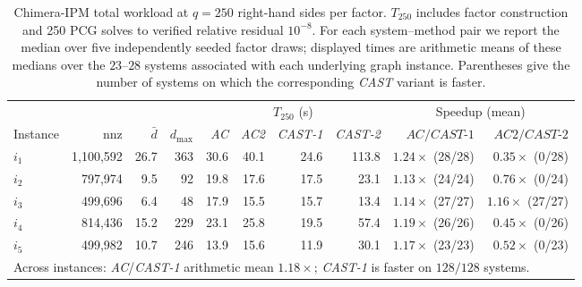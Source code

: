 \documentclass{article}
\newcommand{\CAST}{\textit{CAST}\xspace}
\newcommand{\CASTone}{\textit{CAST-1}\xspace}
\newcommand{\CASTtwo}{\textit{CAST-2}\xspace}
\newcommand{\AC}{\textit{AC}\xspace}
\newcommand{\ACtwo}{\textit{AC2}\xspace}
\newcommand{\1}{\mathbbm{1}}
\theoremstyle{plain}
\begin{document}
\begin{table}[t]
\centering
\caption{Chimera-IPM total workload at $q=250$ right-hand sides per factor.
$T_{250}$ includes factor construction and 250 PCG solves to verified
relative residual $10^{-8}$. For each system--method pair we report
the median over five independently seeded factor draws; displayed
times are arithmetic means of these medians over the $23$--$28$
systems associated with each underlying graph instance. Parentheses give the number
of systems on which the corresponding \CAST{} variant is faster. } 
\label{tab:chimera250}
\small
\begin{tabular}{l r r r rrrr rr}
\toprule
& & & & \multicolumn{4}{c}{$T_{250}$ (s)} &
\multicolumn{2}{c}{Speedup (mean)} \\
\cmidrule(lr){5-8}\cmidrule(lr){9-10}
Instance & nnz & $\bar d$ & $d_{\max}$ &
\AC & \ACtwo & \CASTone & \CASTtwo &
$\AC/\CASTone$ &
$\ACtwo/\CASTtwo$ \\
\midrule
$i_1$ & 1{,}100{,}592 & 26.7 & 363 & 30.6 & 40.1 & 24.6 & 113.8 & $1.24\times$ (28/28) & $0.35\times$ (0/28) \\
$i_2$ & 797{,}974 & 9.5 & 92 & 19.8 & 17.6 & 17.5 & 23.1 & $1.13\times$ (24/24) & $0.76\times$ (0/24) \\
$i_3$ & 499{,}696 & 6.4 & 48 & 17.9 & 15.5 & 15.7 & 13.4 & $1.14\times$ (27/27) & $1.16\times$ (27/27) \\
$i_4$ & 814{,}436 & 15.2 & 229 & 23.1 & 25.8 & 19.5 & 57.4 & $1.19\times$ (26/26) & $0.45\times$ (0/26) \\
$i_5$ & 499{,}982 & 10.7 & 246 & 13.9 & 15.6 & 11.9 & 30.1 & $1.17\times$ (23/23) & $0.52\times$ (0/23) \\
\midrule
\multicolumn{10}{l}{Across instances: \AC/\CASTone arithmetic mean $\mathbf{1.18\times}$; \CASTone is faster on $128/128$ systems.} \\
\bottomrule
\end{tabular}
\end{table}
\end{document}
